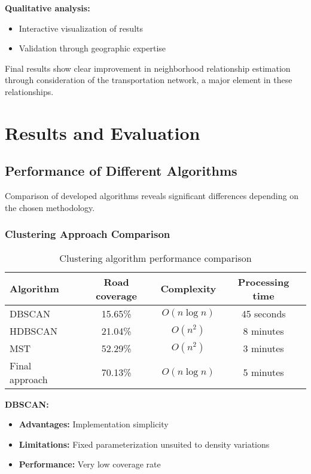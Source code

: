 \documentclass[12pt,a4paper]{report}
\begin{document}
\textbf{Qualitative analysis:}
\begin{itemize}
    \item Interactive visualization of results
    \item Validation through geographic expertise
\end{itemize}

Final results show clear improvement in neighborhood relationship estimation through consideration of the transportation network, a major element in these relationships.

\chapter{Results and Evaluation}
\label{chap:resultats}

\section{Performance of Different Algorithms}

Comparison of developed algorithms reveals significant differences depending on the chosen methodology.

\subsection{Clustering Approach Comparison}

\begin{table}[H]
\centering
\caption{Clustering algorithm performance comparison}
\begin{tabular}{|l|c|c|c|}
\hline
\textbf{Algorithm} & \textbf{Road coverage} & \textbf{Complexity} & \textbf{Processing time} \\
\hline
DBSCAN & 15.65\% & $O(n \log n)$ & 45 seconds \\
HDBSCAN & 21.04\% & $O(n^2)$ & 8 minutes \\
MST & 52.29\% & $O(n^2)$ & 3 minutes \\
Final approach & 70.13\% & $O(n \log n)$ & 5 minutes \\
\hline
\end{tabular}
\label{tab:performance-algo}
\end{table}

\textbf{DBSCAN:}
\begin{itemize}
    \item \textbf{Advantages:} Implementation simplicity
    \item \textbf{Limitations:} Fixed parameterization unsuited to density variations
    \item \textbf{Performance:} Very low coverage rate
\end{itemize}
\end{document}
